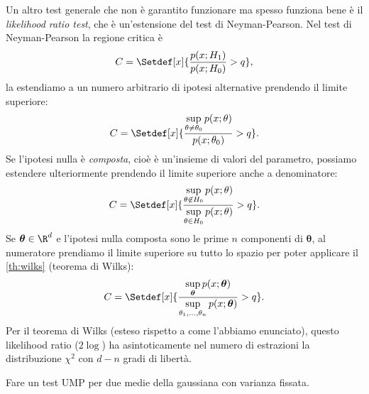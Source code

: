 Un altro test generale che non è garantito funzionare ma spesso funziona bene
è il \emph{likelihood ratio test}, che è un'estensione del test di Neyman-Pearson.
Nel test di Neyman-Pearson la regione critica è
\begin{equation*}
	C = \Setdef[x]{\frac{p(x;H_1)}{p(x;H_0)} > q},
\end{equation*}
la estendiamo a un numero arbitrario di ipotesi alternative prendendo il limite superiore:
\begin{equation*}
	C = \Setdef[x]{\frac {\sup\limits_{\theta\neq\theta_0} p(x;\theta)} {p(x;\theta_0)} > q}.
\end{equation*}
Se l'ipotesi nulla è \emph{composta},
cioè è un'insieme di valori del parametro,
possiamo estendere ulteriormente prendendo il limite superiore anche a denominatore:
\begin{equation*}
	C = \Setdef[x]{\frac {\sup\limits_{\theta\not\in H_0} p(x;\theta)} {\sup\limits_{\theta\in H_0} p(x;\theta)} > q}.
\end{equation*}
Se $\boldsymbol\theta\in\R^d$
e l'ipotesi nulla composta sono le prime $n$ componenti di $\boldsymbol\theta$,
al numeratore prendiamo il limite superiore su tutto lo spazio
per poter applicare il \autoref{th:wilks} (teorema di Wilks):
\begin{equation*}
	C = \Setdef[x]{\frac
	{\sup\limits_{\boldsymbol\theta} p(x;\boldsymbol\theta)}
	{\sup\limits_{\theta_1,\dotsc,\theta_n} p(x;\boldsymbol\theta)} > q}.
\end{equation*}
Per il teorema di Wilks (esteso rispetto a come l'abbiamo enunciato),
questo likelihood ratio ($2\log$) ha asintoticamente nel numero di estrazioni
la distribuzione $\chi^2$ con $d-n$ gradi di libertà.


\begin{exercise}
	Fare un test UMP per due medie della gaussiana con varianza fissata.
\end{exercise}

